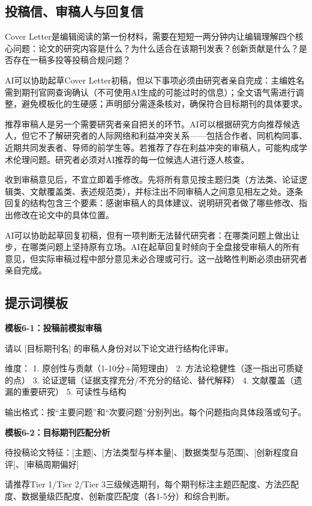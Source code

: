 \subsection{投稿信、审稿人与回复信}

Cover Letter是编辑阅读的第一份材料，需要在短短一两分钟内让编辑理解四个核心问题：论文的研究内容是什么？为什么适合在该期刊发表？创新贡献是什么？是否存在一稿多投等投稿合规问题？

AI可以协助起草Cover Letter初稿，但以下事项必须由研究者亲自完成：主编姓名需到期刊官网查询确认（不可使用AI生成的可能过时的信息）；全文语气需进行调整，避免模板化的生硬感；声明部分需逐条核对，确保符合目标期刊的具体要求。

推荐审稿人是另一个需要研究者亲自把关的环节。AI可以根据研究方向推荐候选人，但它不了解研究者的人际网络和利益冲突关系——包括合作者、同机构同事、近期共同发表者、导师的前学生等。若推荐了存在利益冲突的审稿人，可能构成学术伦理问题。研究者必须对AI推荐的每一位候选人进行逐人核查。

收到审稿意见后，不宜立即着手修改。先将所有意见按主题归类（方法类、论证逻辑类、文献覆盖类、表述规范类），并标注出不同审稿人之间意见相左之处。逐条回复的结构包含三个要素：感谢审稿人的具体建议、说明研究者做了哪些修改、指出修改在论文中的具体位置。

AI可以协助起草回复初稿，但有一项判断无法替代研究者：在哪类问题上做出让步，在哪类问题上坚持原有立场。AI在起草回复时倾向于全盘接受审稿人的所有意见，但实际审稿过程中部分意见未必合理或可行。这一战略性判断必须由研究者亲自完成。

\subsection*{提示词模板}

\textbf{模板6-1：投稿前模拟审稿}

\begin{tcolorbox}[promptbox]
请以 [目标期刊名] 的审稿人身份对以下论文进行结构化评审。

维度：
1. 原创性与贡献（1-10分+简短理由）
2. 方法论稳健性（逐一指出可质疑的点）
3. 论证逻辑（证据支撑充分/不充分的结论、替代解释）
4. 文献覆盖（遗漏的重要研究）
5. 可读性与结构

输出格式：按``主要问题''和``次要问题''分别列出。每个问题指向具体段落或句子。
\end{tcolorbox}

\textbf{模板6-2：目标期刊匹配分析}

\begin{tcolorbox}[promptbox]
待投稿论文特征：[主题]、[方法类型与样本量]、[数据类型与范围]、[创新程度自评]、[审稿周期偏好]

请推荐Tier 1/Tier 2/Tier 3三级候选期刊，每个期刊标注主题匹配度、方法匹配度、数据量级匹配度、创新度匹配度（各1-5分）和综合判断。
\end{tcolorbox}

